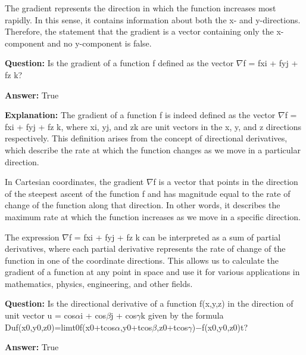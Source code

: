 \documentclass{article}
\begin{document}
The gradient represents the direction in which the function increases most rapidly. In this sense, it contains information about both the x- and y-directions. Therefore, the statement that the gradient is a vector containing only the x-component and no y-component is false.
                
                \vspace{0.5cm} 
        
            
                \textbf {Question:} Is the gradient of a function f defined as the vector \ensuremath{\nabla}f = fxi + fyj + fz k?
                
                \textbf{Answer:} True

                \textbf{Explanation:} The gradient of a function f is indeed defined as the vector \ensuremath{\nabla}f = fxi + fyj + fz k, where xi, yj, and zk are unit vectors in the x, y, and z directions respectively. This definition arises from the concept of directional derivatives, which describe the rate at which the function changes as we move in a particular direction.

In Cartesian coordinates, the gradient \ensuremath{\nabla}f is a vector that points in the direction of the steepest ascent of the function f and has magnitude equal to the rate of change of the function along that direction. In other words, it describes the maximum rate at which the function increases as we move in a specific direction.

The expression \ensuremath{\nabla}f = fxi + fyj + fz k can be interpreted as a sum of partial derivatives, where each partial derivative represents the rate of change of the function in one of the coordinate directions. This allows us to calculate the gradient of a function at any point in space and use it for various applications in mathematics, physics, engineering, and other fields.
                
                \vspace{0.5cm} 
        
            
                \textbf {Question:} Is the directional derivative of a function f(x,y,z) in the direction of unit vector u = cos\ensuremath{\alpha}i + cos\ensuremath{\beta}j + cos\ensuremath{\gamma}k given by the formula Duf(x0,y0,z0)=limt{\textrightarrow}0f(x0+tcos\ensuremath{\alpha},y0+tcos\ensuremath{\beta},z0+tcos\ensuremath{\gamma})\ensuremath{-}f(x0,y0,z0)t?
                
                \textbf{Answer:} True
\end{document}
